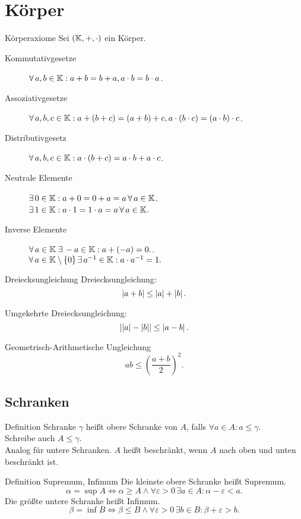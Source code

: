 \documentclass[main.tex]{subfiles}
\begin{document}
\section*{Körper}
\begin{karte}{Körperaxiome}
    Sei \( (\mathbb{K}, +, \cdot ) \) ein Körper.
    \begin{description}
        \item[Kommutativgesetze] \( \forall a,b\in \K: a + b = b + a, a \cdot b = b \cdot a \).
        \item[Assoziativgesetze] \( \forall a,b,c \in \K: 
        a + (b + c) = (a + b) + c, a \cdot (b \cdot c) = (a \cdot b) \cdot c \).
        \item[Distributivgesetz] \( \forall a,b,c\in \K: 
        a \cdot (b + c) = a \cdot b + a \cdot c \).
        \item[Neutrale Elemente] 
        \( \exists 0 \in \K: a + 0 = 0 + a = a \,\forall a \in \K \).\\
        \( \exists 1 \in \K: a \cdot 1 = 1 \cdot a = a \,\forall a \in \K \).
        \item[Inverse Elemente] 
        \( \forall a \in \K \;\exists -a \in \K: a + (-a) = 0. \).\\
        \( \forall a \in \K \setminus \set{0} \, \exists a^{-1} \in \K: a \cdot a^{-1} = 1. \)
    \end{description}
\end{karte}
\begin{karte}{Dreiecksungleichung}
   Dreiecksungleichung: 
   \[ \left| a + b \right| \leq \left| a \right| + \left| b \right|. \]

   Umgekehrte Dreiecksungleichung: 
   \[ \left|  \left| a \right| - \left| b \right|  \right| \leq \left|  a - b  \right|. \]
\end{karte}
\begin{karte}{Geometrisch-Arithmetische Ungleichung}
    \[ ab \leq {\left( \frac{a + b}{2} \right)}^2. \]
\end{karte}
\subsection*{Schranken}
\begin{karte}{Definition Schranke}
    \( \gamma \) heißt 
    obere Schranke von \(A\), falls \( \forall a \in A : a \leq \gamma \).\\
    Schreibe auch \( A \leq \gamma \).\\
    Analog für untere Schranken.
    \( A \) heißt beschränkt, wenn \(A\) nach oben und unten beschränkt ist.
\end{karte}
\begin{karte}{Definition Supremum, Infimum}
    Die kleinste obere Schranke heißt Supremum.
    \[ \alpha = \sup A \Leftrightarrow \alpha \geq A \wedge 
    \forall \varepsilon > 0 \,\exists a \in A: \alpha - \varepsilon < a. \]
    Die größte untere Schranke heißt Infimum.
    \[ \beta = \inf B \Leftrightarrow \beta \leq B \wedge 
    \forall \varepsilon > 0 \,\exists b \in B: \beta + \varepsilon > b. \]
\end{karte}
\end{document}
